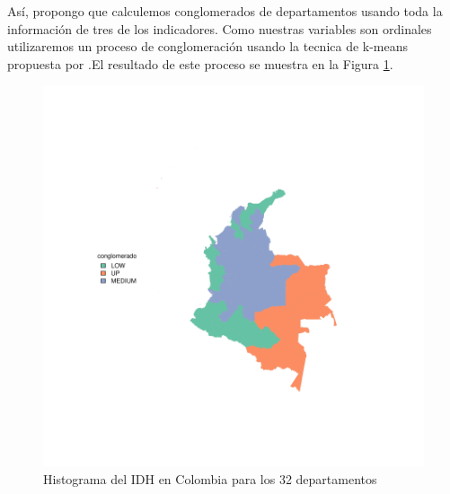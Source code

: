 As\'i, propongo que calculemos conglomerados de departamentos usando toda la informaci\'on de tres de los indicadores. Como nuestras variables son ordinales utilizaremos un proceso de conglomeraci\'on usando la tecnica de k-means propuesta por \textbf{\cite{macqueen_methods_1966}}.El resultado de este proceso se muestra en la Figura \ref{mapa}. 

\begin{figure}[H]
\centering
\includegraphics[width=\textwidth,trim={2cm 2cm 3cm 3cm},clip]{Modelos_regresion-plotMap1}
\caption{Histograma del IDH en Colombia para los 32 departamentos}
\label{mapa}
\end{figure}
\endinput
